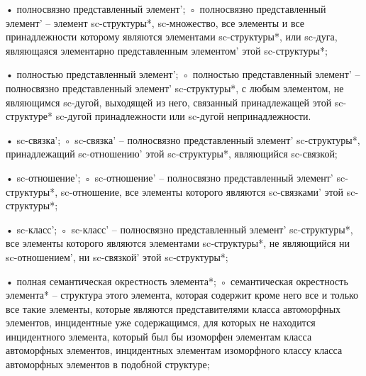 \begin{SCn}
\end{SCn}
• полносвязно представленный элемент’;
◦ полносвязно представленный элемент’ – элемент sc-структуры*, sc‑множество, все элементы и все принадлежности которому являются элементами sc-структуры*, или sc‑дуга, являющаяся элементарно представленным элементом’ этой sc-структуры*;

\begin{SCn}
\end{SCn}
• полностью представленный элемент’;
◦ полностью представленный элемент’ – полносвязно представленный элемент’ sc‑структуры*, с любым элементом, не являющимся sc-дугой, выходящей из него, связанный принадлежащей этой sc-структуре* sc-дугой принадлежности  или sc-дугой непринадлежности.

\begin{SCn}
\end{SCn}
• sc-связка’;
◦ sc-связка’ – полносвязно представленный элемент’ sc-структуры*, принадлежащий sc‑отношению’ этой sc-структуры*, являющийся sc-связкой;

\begin{SCn}
\end{SCn}
• sc-отношение’;
◦ sc-отношение’ – полносвязно представленный элемент’ sc-структуры*, sc-отношение, все элементы которого являются sc-связками’ этой sc-структуры*;

\begin{SCn}
\end{SCn}
• sc-класс’;
◦ sc-класс’ – полносвязно представленный элемент’ sc-структуры*, все элементы которого являются элементами sc‑структуры*, не являющийся ни sc-отношением’, ни sc-связкой’ этой sc‑структуры*;

\begin{SCn}
\end{SCn}
• полная семантическая окрестность элемента*;
◦ семантическая окрестность элемента* – структура этого элемента, которая содержит кроме него все и только все такие элементы, которые являются представителями класса  автоморфных элементов, инцидентные уже содержащимся, для которых не находится инцидентного элемента, который был бы изоморфен элементам класса автоморфных элементов, инцидентных элементам изоморфного классу  класса автоморфных элементов в подобной структуре;

